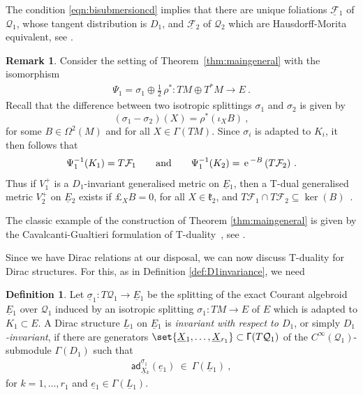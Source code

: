 \documentclass[a4paper, reqno, 11pt]{amsart}
\numberwithin{equation}{section}
\theoremstyle{definition}
\newtheorem{definition}[equation]{Definition}
\newtheorem{remark}[equation]{Remark}
\newcommand{\sfgamma}{\mathsf{\Gamma}}
\newcommand{\red}[1]{\underline{#1}}
\newcommand{\frk}[1]{\mathfrak{#1}}
\newcommand{\e}{\mathrm{e}}
\def\e{{\,\rm e}\,}
\newcommand{\cQ}{{\mathcal Q}}
\newcommand{\cF}{{\mathcal F}}
\newcommand{\sfOmega}{{\mathsf{\Omega}}}
\newcommand{\ad}{\mathsf{ad}}
\theoremstyle{remark}
\begin{document}
The condition \eqref{eqn:bisubmersioncd} implies that there are unique foliations $\red \cF{}_1$ of $\cQ_1$, whose tangent distribution is $D_1$, and $\red \cF{}_2$ of $\cQ_2$ which are Hausdorff-Morita equivalent, see \cite{Garmendia2019}.

\begin{remark} \label{rmk:tdualsplitiso}
 Consider the setting of Theorem~\ref{thm:maingeneral} with the isomorphism 
 \begin{align}
 \Psi_1 = \sigma_1 \oplus \tfrac{1}{2}\,\rho^* \colon TM \oplus T^*M \longrightarrow E \ .
 \end{align}
 Recall that the difference between two isotropic splittings $\sigma_1$ and $\sigma_2$ is given by $$(\sigma_1 - \sigma_2)(X)= \rho^*(\iota_X B) \ , $$ for some $B \in \sfOmega^2(M)$ and for all $X \in \sfgamma(TM)$. Since $\sigma_i$ is adapted to $K_i$, it then follows that
 \begin{align}
 \Psi_1^{-1}(K_1) = T\cF_1 \qquad \text{and} \qquad \Psi_1^{-1}(K_2)= \e^{-B}\,(T\cF_2) \ . 
 \end{align}
Thus if $V_1^+$ is a $D_1$-invariant generalised metric on $\red E{}_1$, then a T-dual generalised metric $V_2^+$ on $\red E{}_2$ exists if $\pounds_X B = 0$, for all $X \in \frk{k}_2$, and $T\cF_1 \cap T\cF_2 \subseteq \ker(B)$~\cite[Theorem 5.44]{DeFraja:2023fhe}.
\end{remark}

The classic example of the construction of Theorem \ref{thm:maingeneral} is given by the Cavalcanti-Gualtieri formulation of T-duality~\cite{cavalcanti2011generalized}, see \cite[Section 6.1]{DeFraja:2023fhe}. 

Since we have Dirac relations at our disposal, we can now discuss T-duality for Dirac structures. For this, as in Definition \ref{def:D1invariance}, we need 

\begin{definition} \label{def:invDirac}
    Let $\red \sigma_1 \colon T\cQ_1 \to \red E{}_1 $ be the splitting of the exact Courant algebroid $\red E{}_1$ over $\cQ_1$ induced by an isotropic  splitting $\sigma_1 \colon TM \to E$ of $E$ which is adapted to $K_1\subset E$.   
    A Dirac structure $\red L{}_1$ on $\red E{}_1$ is \emph{invariant with respect to $D_1$}, or simply \emph{$D_1$-invariant}, if there are generators $\set{\red X{}_1,\dots, \red X{}_{r_1}}\subset \sfgamma(T\cQ_1)$ of the $C^\infty(\cQ_1)$-submodule $\sfgamma(D_1)$ such that
    \begin{align}
        \ad^{\red \sigma_1}_{\red X{}_k} (\red e{}_1 ) \ \in \ \mathsf{\Gamma}(\red L{}_1) \ ,
    \end{align}
    for $k=1,\dots,r_1$ and $\red e{}_1\in \mathsf{\Gamma}(\red L{}_1)$.  
\end{definition}
\end{document}

